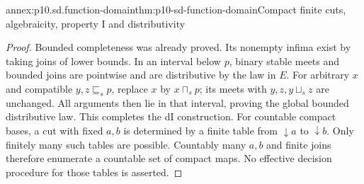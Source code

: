 \begin{annexitem}{annex:p10.sd.function-domain}{thm:p10-sd-function-domain}{Compact finite cuts, algebraicity, property I and distributivity}
\begin{proof}
Bounded completeness was already proved. Its nonempty infima exist by
taking joins of lower bounds. In an interval below \(p\), binary stable
meets and bounded joins are pointwise and are distributive by the law
in \(E\). For arbitrary \(x\) and compatible \(y,z\sqsubseteq_s p\),
replace \(x\) by \(x\sqcap_s p\); its meets with \(y,z,y\sqcup_s z\)
are unchanged. All arguments then lie in that interval, proving the
global bounded distributive law. This completes the dI construction.
For countable compact bases, a cut with fixed \(a,b\) is determined
by a finite table from \(\downarrow a\) to \(\downarrow b\).
Only finitely many such tables are possible. Countably many \(a,b\)
and finite joins therefore enumerate a countable set of compact maps.
No effective decision procedure for those tables is asserted.
\end{proof}
\end{annexitem}


